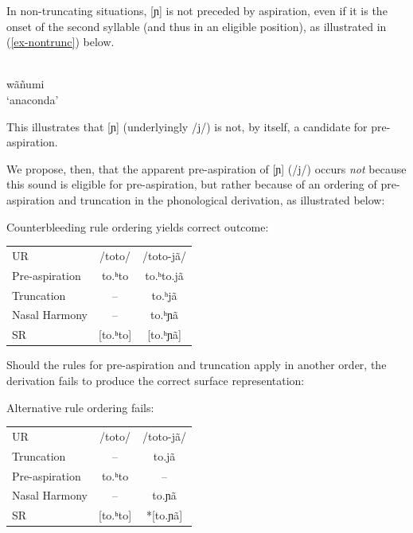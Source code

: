 \documentclass[output=paper]{langscibook}
\begin{document}
In non-truncating situations, [ɲ] is not preceded by aspiration, even if it is the onset of the second syllable (and thus in an eligible position), as illustrated in (\ref{ex-nontrunc}) below.

\begin{exe}
\ex \label{ex-nontrunc}
\gll [wãɲumi]\\
	  wãñumi\\
\trans `anaconda'
\end{exe}

This illustrates that [ɲ] (underlyingly /j/) is not, by itself, a candidate for pre-aspiration.

We propose, then, that the apparent pre-aspiration of [ɲ] (/j/) occurs \emph{not} because this sound is eligible for pre-aspiration, but rather because of an ordering of pre-aspiration and truncation in the phonological derivation, as illustrated below:

\begin{exe}
\ex  Counterbleeding rule ordering yields correct outcome:\smallskip\\\label{exe-counterbleeding}
\begin{tabular}{@{}lcc}
UR				&	/toto/				&	/toto-jã/			\\
Pre-aspiration		&	to.ʰto		&	to.ʰto.jã	\\
Truncation		&	--				&	to.ʰjã		\\
Nasal Harmony			&	--				&	to.ʰɲã		\\
SR				&	[to.ʰto]		&	[to.ʰɲã]		\\
\end{tabular}
\end{exe}

Should the rules for pre-aspiration and truncation apply in another order, the derivation fails to produce the correct surface representation:

\begin{exe}
\ex Alternative rule ordering fails:\smallskip\\\label{exe-bleeding}
\begin{tabular}{@{}lcc}
UR				&	/toto/				&	/toto-jã/		\\
Truncation		&	--				&	to.jã		\\
Pre-aspiration		&	to.ʰto		&	--			\\
Nasal Harmony			&	--				&	to.ɲã		\\
SR				&	[to.ʰto]		&	*[to.ɲã]		\\
\end{tabular}
\end{exe}
\end{document}
